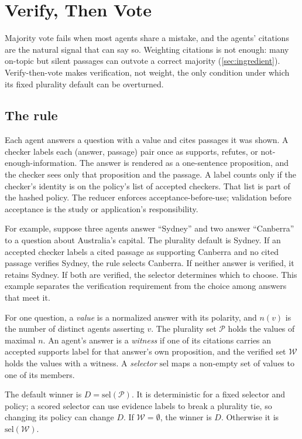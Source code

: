 \section{Verify, Then Vote}
\label{sec:gate}

Majority vote fails when most agents share a mistake, and the agents' citations are the natural signal that can say so. Weighting citations is not enough: many on-topic but silent passages can outvote a correct majority (\cref{sec:ingredient}). Verify-then-vote makes verification, not weight, the only condition under which its fixed plurality default can be overturned.

\subsection{The rule}

Each agent answers a question with a value and cites passages it was shown. A checker labels each (answer, passage) pair once as supports, refutes, or not-enough-information. The answer is rendered as a one-sentence proposition, and the checker sees only that proposition and the passage. A label counts only if the checker's identity is on the policy's list of accepted checkers. That list is part of the hashed policy. The reducer enforces acceptance-before-use; validation before acceptance is the study or application's responsibility.

For example, suppose three agents answer ``Sydney'' and two answer ``Canberra'' to a question about Australia's capital. The plurality default is Sydney. If an accepted checker labels a cited passage as supporting Canberra and no cited passage verifies Sydney, the rule selects Canberra. If neither answer is verified, it retains Sydney. If both are verified, the selector determines which to choose. This example separates the verification requirement from the choice among answers that meet it.

For one question, a \emph{value} is a normalized answer with its polarity, and $n(v)$ is the number of distinct agents asserting $v$. The plurality set $\mathcal{P}$ holds the values of maximal $n$. An agent's answer is a \emph{witness} if one of its citations carries an accepted supports label for that answer's own proposition, and the verified set $\mathcal{W}$ holds the values with a witness. A \emph{selector} $\mathrm{sel}$ maps a non-empty set of values to one of its members.

\begin{definition}
\label{def:gate}
The default winner is $D = \mathrm{sel}(\mathcal{P})$. It is deterministic for a fixed selector and policy; a scored selector can use evidence labels to break a plurality tie, so changing its policy can change $D$. If $\mathcal{W} = \emptyset$, the winner is $D$. Otherwise it is $\mathrm{sel}(\mathcal{W})$.
\end{definition}

